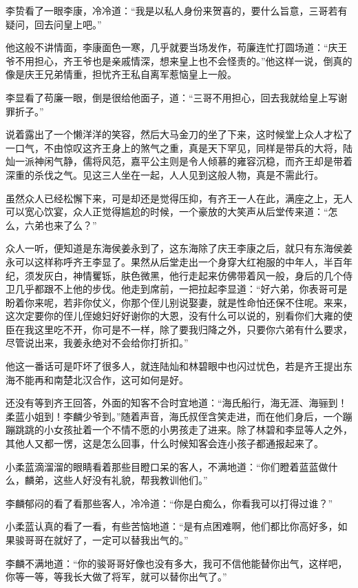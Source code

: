 李贽看了一眼李康，冷冷道：“我是以私人身份来贺喜的，要什么旨意，三哥若有疑问，回去问皇上吧。”

他这般不讲情面，李康面色一寒，几乎就要当场发作，苟廉连忙打圆场道：“庆王爷不用担心，齐王爷也是亲戚情深，想来皇上也不会怪责的。”他这样一说，倒真的像是庆王兄弟情重，担忧齐王私自离军惹恼皇上一般。

李显看了苟廉一眼，倒是很给他面子，道：“三哥不用担心，回去我就给皇上写谢罪折子。”

说着露出了一个懒洋洋的笑容，然后大马金刀的坐了下来，这时候堂上众人才松了一口气，不由惊叹这齐王身上的煞气之重，真是天下罕见，同样是带兵的大将，陆灿一派神闲气静，儒将风范，嘉平公主则是令人倾慕的雍容沉稳，而齐王却是带着深重的杀伐之气。见这三人坐在一起，人人见到这般人物，真是不需此行。

虽然众人已经松懈下来，可是却还是觉得压抑，有齐王一人在此，满座之上，无人可以宽心饮宴，众人正觉得尴尬的时候，一个豪放的大笑声从后堂传来道：“怎么，六弟也来了么？”

众人一听，便知道是东海侯姜永到了，这东海除了庆王李康之后，就只有东海侯姜永可以这样称呼齐王李显了。果然从后堂走出一个身穿大红袍服的中年人，半百年纪，须发灰白，神情矍铄，肤色微黑，他行走起来仿佛带着风一般，身后的几个侍卫几乎都跟不上他的步伐。他走到席前，一把拉起李显道：“好六弟，你表哥可是盼着你来呢，若非你仗义，你那个侄儿别说娶妻，就是性命怕还保不住呢。来来，这次定要你的侄儿侄媳妇好好谢你的大恩，没有什么可以说的，别看你们大雍的使臣在我这里吃不开，你可是不一样，除了要我归降之外，只要你六弟有什么要求，尽管说出来，我姜永绝对不会给你打折扣。”

他这一番话可是吓坏了很多人，就连陆灿和林碧眼中也闪过忧色，若是齐王提出东海不能再和南楚北汉合作，这可如何是好。

还没有等到齐王回答，外面的知客不合时宜地道：“海氏船行，海无涯、海骊到！柔蓝小姐到！李麟少爷到。”随着声音，海氏叔侄含笑走进，而在他们身后，一个蹦蹦跳跳的小女孩扯着一个不情不愿的小男孩走了进来。除了林碧和李显等人之外，其他人又都一愣，这是怎么回事，什么时候知客会连小孩子都通报起来了。

小柔蓝滴溜溜的眼睛看着那些目瞪口呆的客人，不满地道：“你们瞪着蓝蓝做什么，麟弟，这些人好没有礼貌，帮我教训他们。”

李麟郁闷的看了看那些客人，冷冷道：“你是白痴么，你看我可以打得过谁？”

小柔蓝认真的看了一看，有些苦恼地道：“是有点困难啊，他们都比你高好多，如果骏哥哥在就好了，一定可以替我出气的。”

李麟不满地道：“你的骏哥哥好像也没有多大，我可不信他能替你出气，这样吧，你等一等，等我长大做了将军，就可以替你出气了。”

